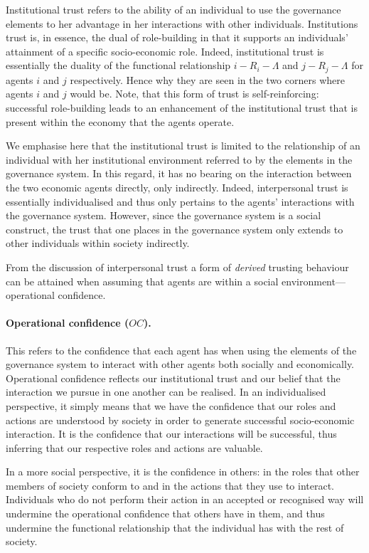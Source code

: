 \begin{subappendices}
Institutional trust refers to the ability of an individual to use the governance elements to her advantage in her interactions with other individuals. Institutions trust is, in essence, the dual of role-building in that it supports an individuals' attainment of a specific socio-economic role. Indeed, institutional trust is essentially the duality of the functional relationship $i-R_{i}-\Lambda$ and $j-R_{j}-\Lambda$ for agents $i$ and $j$ respectively. Hence why they are seen in the two corners where agents $i$ and $j$ would be. Note, that this form of trust is self-reinforcing: successful role-building leads to an enhancement of the institutional trust that is present within the economy that the agents operate.

We emphasise here that the institutional trust is limited to the relationship of an individual with her institutional environment referred to by the elements in the governance system. In this regard, it has no bearing on the interaction between the two economic agents directly, only indirectly. Indeed, interpersonal trust is essentially individualised and thus only pertains to the agents' interactions with the governance system. However, since the governance system is a social construct, the trust that one places in the governance system only extends to other individuals within society indirectly.

From the discussion of interpersonal trust a form of \textit{derived} trusting behaviour can be attained when assuming that agents are within a social environment---operational confidence.

\paragraph{Operational confidence ($OC$).}

This refers to the confidence that each agent has when using the elements of the governance system to interact with other agents both socially and economically. Operational confidence reflects our institutional trust and our belief that the interaction we pursue in one another can be realised. In an individualised perspective, it simply means that we have the confidence that our roles and actions are understood by society in order to generate successful socio-economic interaction. It is the confidence that our interactions will be successful, thus inferring that our respective roles and actions are valuable.

In a more social perspective, it is the confidence in others: in the roles that other members of society conform to and in the actions that they use to interact. Individuals who do not perform their action in an accepted or recognised way will undermine the operational confidence that others have in them, and thus undermine the functional relationship that the individual has with the rest of society.


\end{subappendices}
